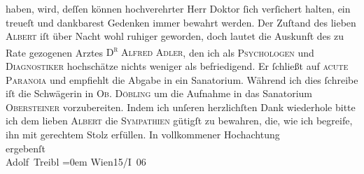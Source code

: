 \begin{ledgroupsized}[t]{13cm}
                    haben, wird, deſſen können hochverehrter Herr Doktor ſich verſichert halten, ein
                    treueſt und dankbarest Gedenken immer bewahrt werden.\pend
           \pstart
           Der Zuſtand des lieben \textsc{Albert} iſt über Nacht wohl ruhiger geworden, doch lautet {\pb}die Auskunft des zu Rate gezogenen Arztes \textsc{D\textsuperscript{r}{ }Alfred Adler}, den ich als \textsc{Psychologen} und \textsc{Diagnostiker} hochschätze nichts weniger als
                    befriedigend. Er ſchließt auf \textsc{acute Paranoia} und
                    empfiehlt die Abgabe in ein Sanatorium.\pend
           \pstart
           Während ich dies ſchreibe iſt die Schwägerin in \textsc{Ob. Döbling} um die Aufnahme in das Sanatorium \textsc{Obersteiner} vorzubereiten.\pend
           \pstart
           Indem ich unſeren herzlichſten Dank wiederhole {\pb}bitte ich dem lieben \textsc{Albert} die \textsc{Sympathien} gütigſt zu bewahren, die, wie ich
                    begreife, ihn mit gerechtem Stolz erfüllen.\pend
           \pstart
           In vollkommener Hochachtung{\\[\baselineskip]}ergebenſt{\\[\baselineskip]}\spacefill\mbox{Adolf Treibl}\pend
           \leftskip=0em{}\pstart
           Wien15/I 06\pend
           \endnumbering{}\end{ledgroupsized}  \newcommand{\dateiname}{L01572}\newcommand{\titel}{Adolf Treibl an Arthur Schnitzler, 15. 1. 1906}\newcommand{\editorInnen}{Martin Anton Müller und Gerd-Hermann Susen}
      